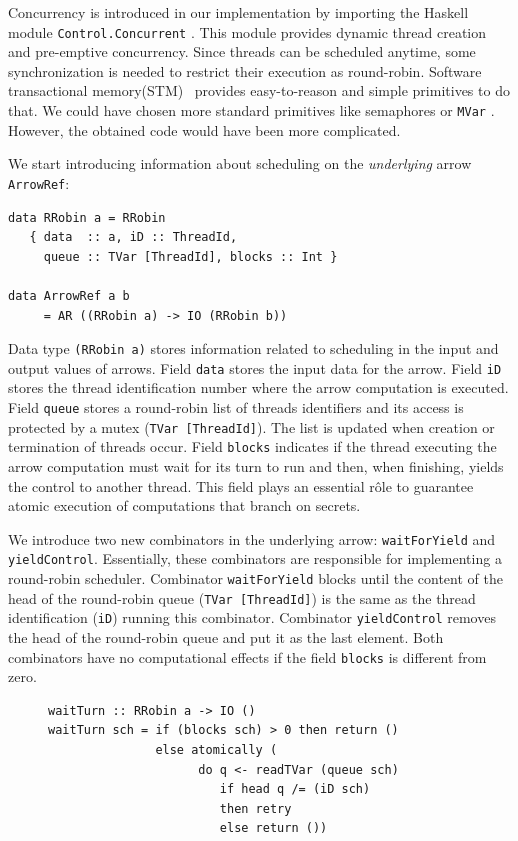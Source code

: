\documentclass[times, 10pt,twocolumn]{article}
\begin{document}
{Concurrency is introduced in our implementation by importing 
the Haskell module \texttt{Control.Concurrent} \cite{finne:1996b,ghc} . This module 
provides dynamic thread creation and pre-emptive
concurrency. 
Since threads can be scheduled 
anytime, some synchronization is needed  
to restrict their execution as round-robin.
Software transactional memory(STM)~\cite{Harris:PPOPP05} provides 
easy-to-reason and simple primitives to do that. 
We could have chosen more standard primitives 
like semaphores or \texttt{MVar} \cite{finne:1996b}. However, the obtained 
code would have been more complicated.

We start introducing information
about scheduling on the \emph{underlying} arrow \texttt{ArrowRef}:
\begin{Verbatim}[fontsize=\footnotesize]
data RRobin a = RRobin
   { data  :: a, iD :: ThreadId,
     queue :: TVar [ThreadId], blocks :: Int }

data ArrowRef a b 
     = AR ((RRobin a) -> IO (RRobin b))
\end{Verbatim}
Data type \texttt{(RRobin a)} stores
information related to scheduling in the 
input and output values of arrows. 
Field \texttt{data} stores the input data for the 
arrow. 
Field \texttt{iD} stores the thread identification number where 
the arrow computation is executed. Field \texttt{queue} stores 
a round-robin list of threads identifiers and its   
access is protected by a mutex (\texttt{TVar [ThreadId]}). 
The list is updated when creation or termination of threads 
occur. Field \texttt{blocks}
indicates if the thread executing the arrow computation 
must wait for its turn to run and then, when finishing, yields the
control to another thread. This field plays an essential r\^ole to
guarantee atomic execution of computations that branch on secrets. 

  
We introduce two new combinators in the underlying arrow: 
\texttt{waitForYield} and \texttt{yieldControl}.  
Essentially, 
these combinators are responsible for implementing a round-robin 
scheduler. Combinator \texttt{waitForYield} blocks until 
the content of the head of the round-robin queue (\texttt{TVar
  [ThreadId]}) is the same as the thread identification (\texttt{iD})
running this combinator. Combinator \texttt{yieldControl} removes the head of the
round-robin queue and put it as the last element. Both combinators
have no computational effects if the field \texttt{blocks} is different
from zero. 
\begin{figure}[t]
\begin{Verbatim}[fontsize=\footnotesize]
waitTurn :: RRobin a -> IO ()
waitTurn sch = if (blocks sch) > 0 then return ()
               else atomically (
                     do q <- readTVar (queue sch)
                        if head q /= (iD sch)
                        then retry
                        else return ())


\end{Verbatim}
\end{figure}}
\end{document}
